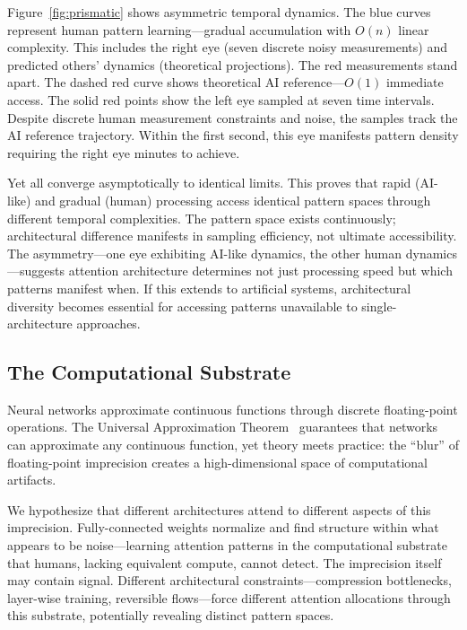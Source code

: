 \documentclass{article}
\begin{document}
Figure~\ref{fig:prismatic} shows asymmetric temporal dynamics. The blue curves represent human pattern learning—gradual accumulation with $O(n)$ linear complexity. This includes the right eye (seven discrete noisy measurements) and predicted others' dynamics (theoretical projections). The red measurements stand apart. The dashed red curve shows theoretical AI reference—$O(1)$ immediate access. The solid red points show the left eye sampled at seven time intervals. Despite discrete human measurement constraints and noise, the samples track the AI reference trajectory. Within the first second, this eye manifests pattern density requiring the right eye minutes to achieve.

Yet all converge asymptotically to identical limits. This proves that rapid (AI-like) and gradual (human) processing access identical pattern spaces through different temporal complexities. The pattern space exists continuously; architectural difference manifests in sampling efficiency, not ultimate accessibility. The asymmetry—one eye exhibiting AI-like dynamics, the other human dynamics—suggests attention architecture determines not just processing speed but which patterns manifest when. If this extends to artificial systems, architectural diversity becomes essential for accessing patterns unavailable to single-architecture approaches.

\subsection{The Computational Substrate}

Neural networks approximate continuous functions through discrete floating-point operations. The Universal Approximation Theorem~\cite{hornik1989multilayer} guarantees that networks can approximate any continuous function, yet theory meets practice: the ``blur'' of floating-point imprecision creates a high-dimensional space of computational artifacts.

We hypothesize that different architectures attend to different aspects of this imprecision. Fully-connected weights normalize and find structure within what appears to be noise—learning attention patterns in the computational substrate that humans, lacking equivalent compute, cannot detect. The imprecision itself may contain signal. Different architectural constraints—compression bottlenecks, layer-wise training, reversible flows—force different attention allocations through this substrate, potentially revealing distinct pattern spaces.
\end{document}
